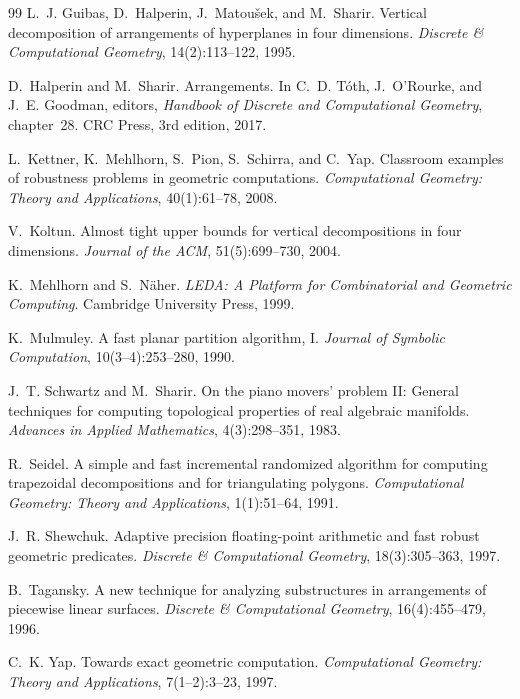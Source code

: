 \documentclass[11pt]{article}
\begin{document}
\begin{thebibliography}{99}
L.~J. Guibas, D.~Halperin, J.~Matou\v{s}ek, and M.~Sharir.
\newblock Vertical decomposition of arrangements of hyperplanes in four
  dimensions.
\newblock \emph{Discrete \& Computational Geometry}, 14(2):113--122, 1995.

D.~Halperin and M.~Sharir.
\newblock Arrangements.
\newblock In C.~D. T\'oth, J.~O'Rourke, and J.~E. Goodman, editors,
  \emph{Handbook of Discrete and Computational Geometry}, chapter~28. CRC
  Press, 3rd edition, 2017.

L.~Kettner, K.~Mehlhorn, S.~Pion, S.~Schirra, and C.~Yap.
\newblock Classroom examples of robustness problems in geometric computations.
\newblock \emph{Computational Geometry: Theory and Applications},
  40(1):61--78, 2008.

V.~Koltun.
\newblock Almost tight upper bounds for vertical decompositions in four
  dimensions.
\newblock \emph{Journal of the ACM}, 51(5):699--730, 2004.

K.~Mehlhorn and S.~N\"aher.
\newblock \emph{LEDA: A Platform for Combinatorial and Geometric Computing}.
\newblock Cambridge University Press, 1999.

K.~Mulmuley.
\newblock A fast planar partition algorithm, I.
\newblock \emph{Journal of Symbolic Computation}, 10(3--4):253--280, 1990.

J.~T. Schwartz and M.~Sharir.
\newblock On the piano movers' problem II: General techniques for computing
  topological properties of real algebraic manifolds.
\newblock \emph{Advances in Applied Mathematics}, 4(3):298--351, 1983.

R.~Seidel.
\newblock A simple and fast incremental randomized algorithm for computing
  trapezoidal decompositions and for triangulating polygons.
\newblock \emph{Computational Geometry: Theory and Applications}, 1(1):51--64,
  1991.

J.~R. Shewchuk.
\newblock Adaptive precision floating-point arithmetic and fast robust
  geometric predicates.
\newblock \emph{Discrete \& Computational Geometry}, 18(3):305--363, 1997.

B.~Tagansky.
\newblock A new technique for analyzing substructures in arrangements of
  piecewise linear surfaces.
\newblock \emph{Discrete \& Computational Geometry}, 16(4):455--479, 1996.

C.~K. Yap.
\newblock Towards exact geometric computation.
\newblock \emph{Computational Geometry: Theory and Applications}, 7(1--2):3--23,
  1997.

\end{thebibliography}
\end{document}
